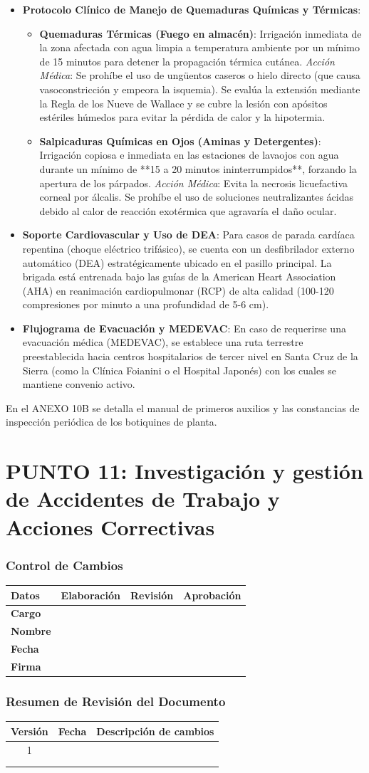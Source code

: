 \documentclass[11pt, letterpaper]{article}
\newcommand{\controlcambios}{
    \subsubsection*{Control de Cambios}
    \begin{table}[H]
        \centering
        \small
        \begin{tabular}{lp{4cm}p{4cm}p{4cm}}
            \toprule
            \textbf{Datos} & \textbf{Elaboración} & \textbf{Revisión} & \textbf{Aprobación} \\
            \midrule
            \textbf{Cargo} & & & \\
            \textbf{Nombre} & & & \\
            \textbf{Fecha} & & & \\
            \textbf{Firma} & & & \\
            \bottomrule
        \end{tabular}
    \end{table}
}
\newcommand{\resumenrevision}[1]{
    \subsubsection*{Resumen de Revisión del Documento}
    \begin{table}[H]
        \centering
        \small
        \begin{tabular}{ccp{8cm}}
            \toprule
            \textbf{Versión} & \textbf{Fecha} & \textbf{Descripción de cambios} \\
            \midrule
            #1 & & \\
            & & \\
            & & \\
            \bottomrule
        \end{tabular}
    \end{table}
}
\begin{document}
\begin{itemize}
    \item \textbf{Protocolo Clínico de Manejo de Quemaduras Químicas y Térmicas}:
    \begin{itemize}
        \item \textbf{Quemaduras Térmicas (Fuego en almacén)}: Irrigación inmediata de la zona afectada con agua limpia a temperatura ambiente por un mínimo de 15 minutos para detener la propagación térmica cutánea. \textit{Acción Médica}: Se prohíbe el uso de ungüentos caseros o hielo directo (que causa vasoconstricción y empeora la isquemia). Se evalúa la extensión mediante la Regla de los Nueve de Wallace y se cubre la lesión con apósitos estériles húmedos para evitar la pérdida de calor y la hipotermia.
        \item \textbf{Salpicaduras Químicas en Ojos (Aminas y Detergentes)}: Irrigación copiosa e inmediata en las estaciones de lavaojos con agua durante un mínimo de **15 a 20 minutos ininterrumpidos**, forzando la apertura de los párpados. \textit{Acción Médica}: Evita la necrosis licuefactiva corneal por álcalis. Se prohíbe el uso de soluciones neutralizantes ácidas debido al calor de reacción exotérmica que agravaría el daño ocular.
    \end{itemize}

    \item \textbf{Soporte Cardiovascular y Uso de DEA}:
    Para casos de parada cardíaca repentina (choque eléctrico trifásico), se cuenta con un desfibrilador externo automático (DEA) estratégicamente ubicado en el pasillo principal. La brigada está entrenada bajo las guías de la American Heart Association (AHA) en reanimación cardiopulmonar (RCP) de alta calidad (100-120 compresiones por minuto a una profundidad de 5-6 cm).

    \item \textbf{Flujograma de Evacuación y MEDEVAC}:
    En caso de requerirse una evacuación médica (MEDEVAC), se establece una ruta terrestre preestablecida hacia centros hospitalarios de tercer nivel en Santa Cruz de la Sierra (como la Clínica Foianini o el Hospital Japonés) con los cuales se mantiene convenio activo.
\end{itemize}

En el ANEXO 10B se detalla el manual de primeros auxilios y las constancias de inspección periódica de los botiquines de planta.
\newpage
\section{PUNTO 11: Investigación y gestión de Accidentes de Trabajo y Acciones Correctivas}
\controlcambios
\resumenrevision{1}
\end{document}
